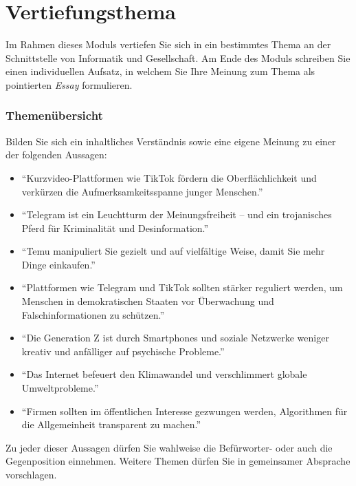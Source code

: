 



\part*{Vertiefungsthema}

Im Rahmen dieses Moduls vertiefen Sie sich in ein bestimmtes Thema an der Schnittstelle von Informatik und Gesellschaft. Am Ende des Moduls schreiben Sie einen individuellen Aufsatz, in welchem Sie Ihre Meinung zum Thema als pointierten \textit{Essay} formulieren.

\section{Themenübersicht}

Bilden Sie sich ein inhaltliches Verständnis sowie eine eigene Meinung zu einer der folgenden Aussagen:

\begin{itemize}
	\item \enquote{Kurzvideo-Plattformen wie TikTok fördern die Oberflächlichkeit und verkürzen die Aufmerksamkeitsspanne junger Menschen.}
	\item \enquote{Telegram ist ein Leuchtturm der Meinungsfreiheit -- und ein trojanisches Pferd für Kriminalität und Desinformation.}
	\item \enquote{Temu manipuliert Sie gezielt und auf vielfältige Weise, damit Sie mehr Dinge einkaufen.}
	\item \enquote{Plattformen wie Telegram und TikTok sollten stärker reguliert werden, um Menschen in demokratischen Staaten vor Überwachung und Falschinformationen zu schützen.}
	\item \enquote{Die Generation Z ist durch Smartphones und soziale Netzwerke weniger kreativ und anfälliger auf psychische Probleme.}
	\item \enquote{Das Internet befeuert den Klimawandel und verschlimmert globale Umweltprobleme.}
	\item \enquote{Firmen sollten im öffentlichen Interesse gezwungen werden, Algorithmen für die Allgemeinheit transparent zu machen.}
\end{itemize}

Zu jeder dieser Aussagen dürfen Sie wahlweise die Befürworter- oder auch die Gegenposition einnehmen. Weitere Themen dürfen Sie in gemeinsamer Absprache vorschlagen.

